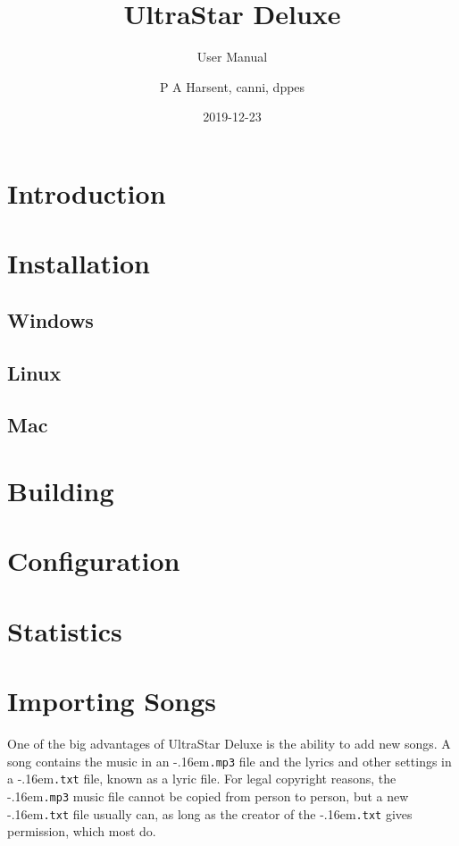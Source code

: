 \documentclass{scrreprt}
\title{UltraStar Deluxe}
\subtitle{User Manual}
\author{P A Harsent, canni, dppes}
\date{2019-12-23}
\newcommand*\fileending[1]{\texorpdfstring{\kern-.16em\texttt{#1}}{#1}}
\begin{document}
\maketitle

\tableofcontents

\chapter{Introduction}

\chapter{Installation}

\section{Windows}

\section{Linux}

\section{Mac}

\chapter{Building}

\chapter{Configuration}

\chapter{Statistics}

\chapter{Importing Songs}

One of the big advantages of UltraStar Deluxe
is the ability to add new songs.
A song contains the music in an \fileending{.mp3} file
and the lyrics and other settings in a \fileending{.txt} file,
known as a lyric file.
For legal copyright reasons,
the \fileending{.mp3} music file cannot be copied from person to person,
but a new \fileending{.txt} file usually can,
as long as the creator of the \fileending{.txt} gives permission, which most do.
\end{document}
